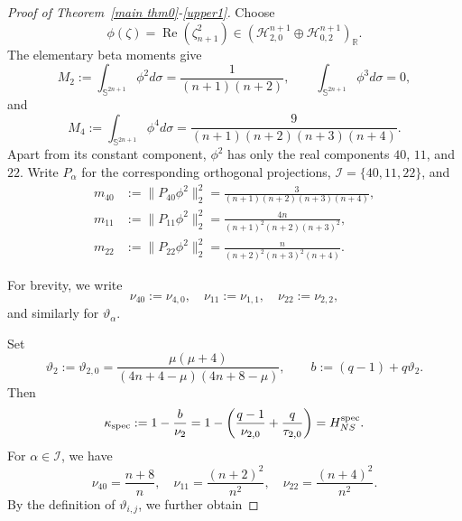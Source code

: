 \documentclass[11pt]{article}
\begin{document}
\begin{proof}[Proof of Theorem~\ref{main thm0}-\eqref{upper1}]
Choose
\begin{equation}\label{phiLi}
 \phi(\zeta)=\operatorname{Re}(\zeta_{n+1}^2)
 \in(\mathcal H_{2,0}^{n+1}\oplus\mathcal H_{0,2}^{n+1})_{\mathbb R}.
\end{equation}
The elementary beta moments give
\begin{equation*}
 M_2:=\int_{\mathbb S^{2n+1}}\phi^2d\sigma=\frac1{(n+1)(n+2)},\qquad
 \int_{\mathbb S^{2n+1}}\phi^3d\sigma=0,
\end{equation*}
and
\begin{equation*}
 M_4:=\int_{\mathbb S^{2n+1}}\phi^4d\sigma=\frac9{(n+1)(n+2)(n+3)(n+4)}.
\end{equation*}
Apart from its constant component, $\phi^2$ has only the real components
$40$, $11$, and $22$. Write $P_\alpha$ for the corresponding orthogonal projections, $\mathcal I=\{40,11,22\}$, and
\begin{equation}\label{projection-masses}
\begin{aligned}
 m_{40}&:=\|P_{40}\phi^2\|_2^2=\frac3{(n+1)(n+2)(n+3)(n+4)},\\
 m_{11}&:=\|P_{11}\phi^2\|_2^2=\frac{4n}{(n+1)^2(n+2)(n+3)^2},\\
 m_{22}&:=\|P_{22}\phi^2\|_2^2=\frac{n}{(n+2)^2(n+3)^2(n+4)}.
\end{aligned}
\end{equation}

For brevity, we write
\begin{equation*}
  \nu_{40}:=\nu_{4,0},\quad \nu_{11}:=\nu_{1,1},\quad \nu_{22}:=\nu_{2,2},
\end{equation*}
and similarly for $\vartheta_\alpha$.

Set
\begin{equation*}
 \vartheta_2:=\vartheta_{2,0}=\frac{\mu(\mu+4)}{(4n+4-\mu)(4n+8-\mu)},\qquad
 b:=(q-1)+q\vartheta_2.
\end{equation*}
Then
\begin{equation*}
 \kappa_{\rm spec}:=1-\frac b{\nu_2}
 =1-\left(\frac{q-1}{\nu_{2,0}}+\frac q{\tau_{2,0}}\right)
 =H_{NS}^{\rm spec}.
\end{equation*}
For $\alpha\in\mathcal I$,
we have
\begin{equation}\label{higher-eigenvalues}
  \nu_{40}=\frac{n+8}{n},\quad \nu_{11}=\frac{(n+2)^2}{n^2}, \quad \nu_{22}=\frac{(n+4)^2}{n^2}.
\end{equation}
By the definition of $\vartheta_{i,j}$, we further obtain


\end{proof}
\end{document}
